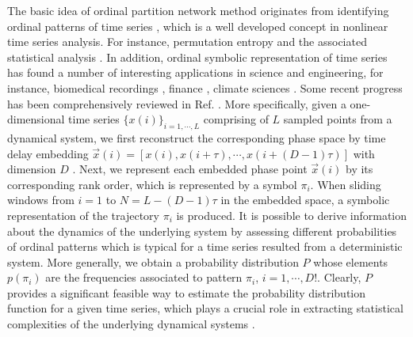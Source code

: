 \documentclass[12pt,aip,cha,reprint,nofootinbib]{revtex4-1}
\begin{document}
The basic idea of ordinal partition network method originates from identifying ordinal patterns of time series \cite{BandtPRL2002}, which is a well developed concept in nonlinear time series analysis. For instance, permutation entropy and the associated statistical analysis \cite{BandtPRL2002}. In addition, ordinal symbolic representation of time series has found a number of interesting applications in science and engineering, for instance, biomedical recordings \cite{AmigoPTRSA2014}, finance \cite{ZaninChaos2008}, climate sciences \cite{BarreiroChaos2011}. Some recent progress has been comprehensively reviewed in Ref. \cite{AmigoPTRSA2014}. More specifically, given a one-dimensional time series $\{ x(i)\}_{i=1, \cdots, L}$ comprising of $L$ sampled points from a dynamical system, we first reconstruct the corresponding phase space by time delay embedding $\vec{x}(i) = [x(i), x(i+\tau), \cdots, x(i+(D-1)\tau)]$ with dimension $D$ \cite{Takens1981,Kantz97}. Next, we represent each embedded phase point $\vec{x}(i)$ by its corresponding rank order, which is represented by a symbol $\pi_{i}$. When sliding windows from $i=1$ to $N = L - (D - 1)\tau$ in the embedded space, a symbolic representation of the trajectory $\pi_i$ is produced. It is possible to derive information about the dynamics of the underlying system by assessing different probabilities of ordinal patterns which is typical for a time series resulted from a deterministic system. More generally, we obtain a probability distribution $P$ whose elements $p(\pi_{i})$ are the frequencies associated to pattern $\pi_{i}$, $i = 1, \cdots, D!$. Clearly, $P$ provides a significant feasible way to estimate the probability distribution function for a given time series, which plays a crucial role in extracting statistical complexities of the underlying dynamical systems \cite{BandtPRL2002,AmigoPTRSA2014}. 
\end{document}
